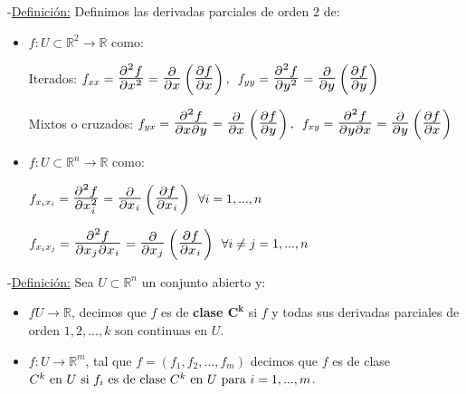 \documentclass[10pt, titlepage]{article}
\newcommand{\R}{\mathbb{R}}
\newcommand{\bfrac}[2]{\scalebox{1.4}{$\frac{#1}{#2}$}}
\newcommand{\spac}{\, \, \,}
\newcommand{\definicion}{\noindent-\underline{Definición:} }
\newcommand{\dindent}{\indent\indent}
\begin{document}
\definicion Definimos las derivadas parciales de orden 2 de:
\vspace{3mm}
\begin{itemize}

\item $f : U \subset \R^2 \to \R$ como:
\vspace{3mm}

\dindent Iterados: $f_{xx} = \bfrac{\partial^2 f}{\partial x^2} = \bfrac{\partial}{\partial x} \left ( \bfrac{
\partial f}{\partial x}\right ), \spac f_{yy} = \bfrac{\partial^2 f}{\partial y^2} = \bfrac{\partial}{\partial y} 
\left ( \bfrac{\partial f}{\partial y} \right )$
\vspace{3mm}

\dindent Mixtos o cruzados: $f_{yx} = \bfrac{\partial^2 f}{\partial x \partial y} = \bfrac{\partial}{\partial x} 
\left ( \bfrac{\partial f}{\partial y}\right ), \spac f_{xy} = \bfrac{\partial^2 f}{\partial y \partial x} = 
\bfrac{\partial}{\partial y} \left ( \bfrac{\partial f}{\partial x} \right )$
\vspace{3mm}

\item $f : U \subset \R^n \to \R$ como:
\vspace{3mm}

\dindent $f_{x_i x_i} = \bfrac{\partial^2 f}{\partial x_i^2} = \bfrac{\partial}{\partial x_i} \left ( \bfrac{
\partial f}{\partial x_i}\right ) \spac \forall i = 1,..., n$
\vspace{3mm}

\dindent $f_{x_i x_j} = \bfrac{\partial^2 f}{\partial x_ j \partial x_i} = \bfrac{\partial}{\partial x_j} \left ( 
\bfrac{\partial f}{\partial x_i}\right ) \spac \forall i \neq  j = 1,..., n$
\vspace{5mm}

\end{itemize}

\definicion Sea $U \subset \R^n$ un conjunto abierto y:
\vspace{3mm}

\begin{itemize}

\item $f U \to \R$, decimos que $f$ es de \textbf{clase $\mathbf{C^k}$} si $f$ y todas sus derivadas 
parciales de orden $1, 2,..., k \text{ son continuas en } U$.
\vspace{1mm}

\item $f : U \to \R^m$, tal que $f = (f_1, f_2,..., f_m)$ decimos que $f$ es de clase $C^k \text{ en } U 
\text{ si } f_i \text{ es de clase } C^k \text{ en } U \text{ para } \\ i = 1,..., m$.
\vspace{5mm}

\end{itemize}
\end{document}
